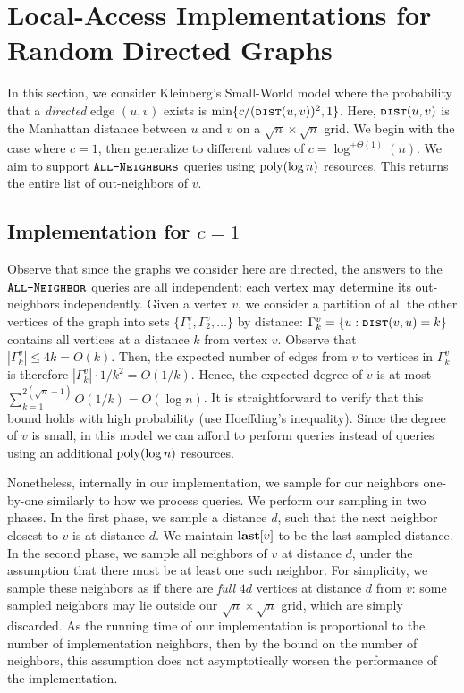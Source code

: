 \section{Local-Access Implementations for Random Directed Graphs}
\label{sec:small_world}

In this section, we consider Kleinberg's Small-World model \cite{kleinberg, klein}
where the probability that a \emph{directed} edge $(u,v)$ exists is $\min\{c/(\texttt{\textsc{dist}}(u,v))^2, 1\}$.
Here, $\texttt{\textsc{dist}}(u,v)$ is the Manhattan distance between $u$ and $v$ on a $\sqrt n\times\sqrt n$ grid.
We begin with the case where $c = 1$, then generalize to different values of $c = \log^{\pm\Theta(1)}(n)$. 
We aim to support $\texttt{\textsc{All-Neighbors}}$ queries using $\mathrm{poly}(\log n)$ resources. 
This returns the entire list of out-neighbors of $v$.

\subsection{Implementation for $c=1$}

Observe that since the graphs we consider here are directed, the answers to the $\texttt{\textsc{All-Neighbor}}$ queries are all independent: each vertex may determine its out-neighbors independently.
Given a vertex $v$, we consider a partition of all the other vertices of the graph into sets $\{\Gamma^v_1, \Gamma^v_2,\ldots\}$ by distance: $\Gamma^v_k = \{u: \texttt{\textsc{dist}}(v,u) = k\}$ contains all vertices at a distance $k$ from vertex $v$. Observe that $|\Gamma^v_k|\leq 4k = O(k)$. Then, the expected number of edges from $v$ to vertices in $\Gamma^v_k$ is therefore $|\Gamma^v_k|\cdot 1/k^2 = O(1/k)$.
Hence, the expected degree of $v$ is at most $\sum_{k=1}^{2(\sqrt{n}-1)}O(1/k) = O(\log n)$.
It is straightforward to verify that this bound holds with high probability (use Hoeffding's inequality).
Since the degree of $v$ is small, in this model we can afford to perform  queries instead of  queries using an additional $\mathrm{poly}(\log n)$ resources.

Nonetheless, internally in our implementation, we sample for our neighbors one-by-one similarly to how we process  queries.
We perform our sampling in two phases.
In the first phase, we sample a distance $d$, such that the next neighbor closest to $v$ is at distance $d$.
We maintain $\mathbf{last}[v]$ to be the last sampled distance.
In the second phase, we sample all neighbors of $v$ at distance $d$, under the assumption that there must be at least one such neighbor.
For simplicity, we sample these neighbors as if there are \emph{full} $4d$ vertices at distance $d$ from $v$:
some sampled neighbors may lie outside our $\sqrt n\times\sqrt n$ grid, which are simply discarded.
As the running time of our implementation is proportional to the number of implementation neighbors,
then by the bound on the number of neighbors, this assumption does not asymptotically worsen the performance of the implementation.

